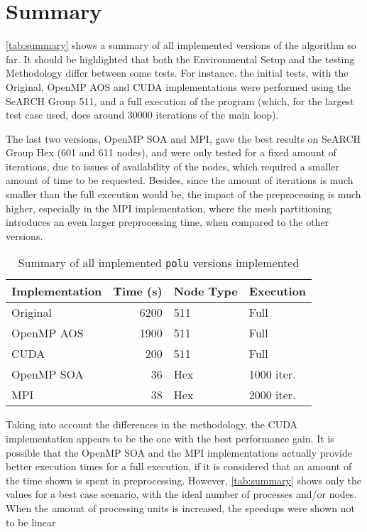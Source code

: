 \section{Summary}
\label{sec:summary}

\cref{tab:summary} shows a summary of all implemented versions of the algorithm so far. It should be highlighted that both the Environmental Setup and the testing Methodology differ between some tests. For instance. the initial tests, with the Original, OpenMP AOS and CUDA implementations were performed using the SeARCH Group 511, and a full execution of the program (which, for the largest test case used, does around 30000 iterations of the main loop).

The last two versions, OpenMP SOA and MPI, gave the best results on SeARCH Group Hex (601 and 611 nodes), and were only tested for a fixed amount of iterations, due to issues of availability of the nodes, which required a smaller amount of time to be requested. Besides, since the amount of iterations is much smaller than the full execution would be, the impact of the preprocessing is much higher, especially in the MPI implementation, where the mesh partitioning introduces an even larger preprocessing time, when compared to the other versions.

\begin{table}[!htp]
		\smaller
		\begin{center}
			\begin{tabular}{l r ll}
			\hline
			\textbf{Implementation} & \textbf{\~ Time (s)}  & \textbf{Node Type}	& \textbf{Execution}	\\ \hline
			Original				& 6200				& 511				& Full							\\
			OpenMP AOS				& 1900				& 511				& Full							\\
			CUDA 					& 200				& 511 				& Full							\\ \hline
			OpenMP SOA 				& 36				& Hex 				& 1000 iter.					\\
			MPI 					& 38				& Hex 				& 2000 iter.					\\
			\hline
			\end{tabular}
		\end{center}
		\caption{Summary of all implemented \texttt{polu} versions implemented}
	\end{table}

Taking into account the differences in the methodology, the CUDA implementation appears to be the one with the best performance gain. It is possible that the OpenMP SOA and the MPI implementations actually provide better execution times for a full execution, if it is considered that an amount of the time shown is spent in preprocessing. However, \cref{tab:summary} shows only the values for a best case scenario, with the ideal number of processes and/or nodes. When the amount of processing units is increased, the speedups were shown not to be linear


